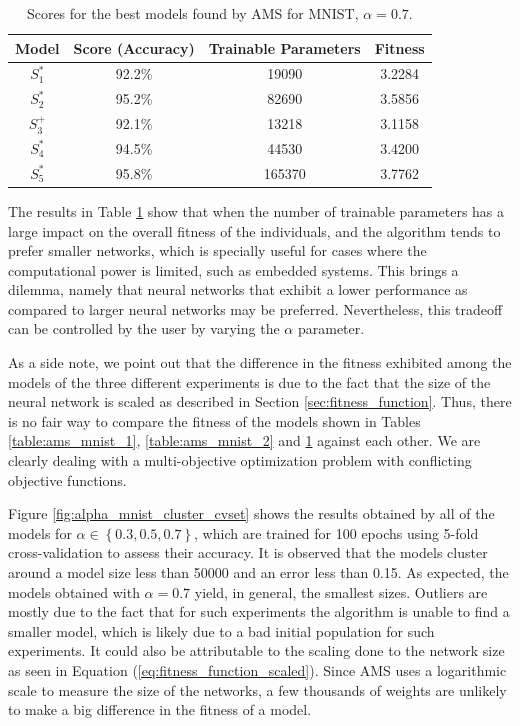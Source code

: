 \documentclass[12pt]{elsart}%
\begin{document}
\begin{table}[!htb]
\begin{center}
\caption{Scores for the best models found by AMS for MNIST, $\alpha = 0.7$.}
\label{table:ams_mnist_3}
\vspace{12pt}
\begin{tabular}{| c | c | c | c |}
\hline
Model & Score (Accuracy) & Trainable Parameters & Fitness\\
\hline
$S^*_1$ & 92.2\% & 19090 & 3.2284\\
$S^*_2$ & 95.2\% & 82690 & 3.5856\\
$S^+_3$ & 92.1\% & 13218 & 3.1158\\
$S^*_4$ & 94.5\% & 44530 & 3.4200\\
$S^*_5$ & 95.8\% & 165370 & 3.7762\\
\hline
\end{tabular}
\end{center}
\end{table}

The results in Table \ref{table:ams_mnist_3} show that when the number of trainable parameters has a large impact on the overall fitness of the individuals, and the algorithm tends to prefer smaller networks, which is specially useful for cases where the computational power is limited, such as embedded systems. This brings a dilemma, namely that neural networks that exhibit a lower performance as compared to larger neural networks may be preferred. Nevertheless, this tradeoff can be controlled by the user by varying the $\alpha$ parameter. 

As a side note, we point out that the difference in the fitness exhibited among the models of the three different experiments is due to the fact that the size of the neural network is scaled as described in Section \ref{sec:fitness_function}. Thus, there is no fair way to compare the fitness of the models shown in Tables \ref{table:ams_mnist_1}, \ref{table:ams_mnist_2} and \ref{table:ams_mnist_3} against each other. We are clearly dealing with a multi-objective optimization problem with conflicting objective functions.

Figure \ref{fig:alpha_mnist_cluster_cvset} shows the results obtained by all of the models for $\alpha \in \left\lbrace 0.3, 0.5, 0.7  \right\rbrace$, which are trained for 100 epochs using 5-fold cross-validation to assess their accuracy. It is observed that the models cluster around a model size less than 50000 and an error less than 0.15. As expected, the models obtained with $\alpha = 0.7$ yield, in general, the smallest sizes. Outliers are mostly due to the fact that for such experiments the algorithm is unable to find a smaller model, which is likely due to a bad initial population for such experiments. It could also be attributable to the scaling done to the network size as seen in Equation  (\ref{eq:fitness_function_scaled}). Since AMS uses a logarithmic scale to measure the size of the networks, a few thousands of weights are unlikely to make a big difference in the fitness of a model. 
\end{document}
